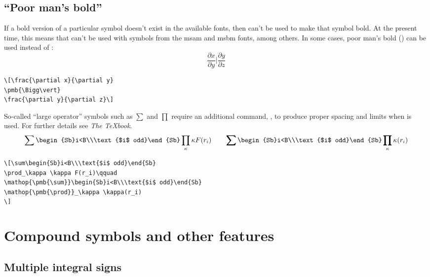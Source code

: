 \subsection{``Poor man's bold''}
If a bold version of a particular symbol doesn't exist in the
available fonts,
then  can't be used to make that symbol bold.
At the present time, this means that
 can't be used with symbols from
the {\sc msam} and {\sc msbm} fonts, among others.
In some cases, poor man's bold () can be used instead
of :
\[\frac{\partial x}{\partial y}
\pmb{\Bigg\vert}
\frac{\partial y}{\partial z}\]
\begin{verbatim}
\[\frac{\partial x}{\partial y}
\pmb{\Bigg\vert}
\frac{\partial y}{\partial z}\]
\end{verbatim}
So-called ``large operator'' symbols such as $\sum$ and $\prod$
require an additional command, , 
to produce proper spacing and limits when  is used.
For further details see {\it The \TeX book}.
\[\sum\begin{Sb}i<B\\\text{$i$ odd}\end{Sb}
\prod_\kappa \kappa F(r_i)\qquad
\mathop{\pmb{\sum}}\begin{Sb}i<B\\\text{$i$ odd}\end{Sb}
\mathop{\pmb{\prod}}_\kappa \kappa(r_i)
\]
\begin{verbatim}
\[\sum\begin{Sb}i<B\\\text{$i$ odd}\end{Sb}
\prod_\kappa \kappa F(r_i)\qquad
\mathop{\pmb{\sum}}\begin{Sb}i<B\\\text{$i$ odd}\end{Sb}
\mathop{\pmb{\prod}}_\kappa \kappa(r_i)
\]
\end{verbatim}

\section{Compound symbols and other features}
\label{s:comp}
\subsection{Multiple integral signs}

